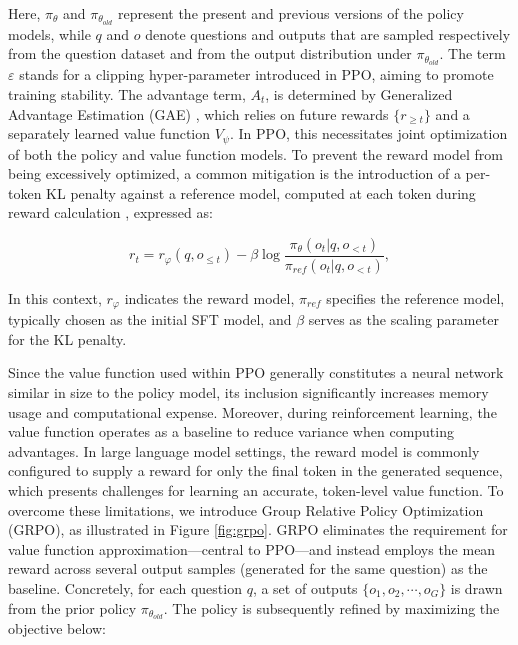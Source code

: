 \begin{itemize}[topsep=0pt]
Here, $\pi_{\theta}$ and $\pi_{\theta_{old}}$ represent the present and previous versions of the policy models, while $q$ and $o$ denote questions and outputs that are sampled respectively from the question dataset and from the output distribution under $\pi_{\theta_{old}}$. The term $\varepsilon$ stands for a clipping hyper-parameter introduced in PPO, aiming to promote training stability. The advantage term, $A_t$, is determined by Generalized Advantage Estimation (GAE) \citep{gae}, which relies on future rewards $\{r_{\ge t}\}$ and a separately learned value function $V_{\psi}$. In PPO, this necessitates joint optimization of both the policy and value function models. To prevent the reward model from being excessively optimized, a common mitigation is the introduction of a per-token KL penalty against a reference model, computed at each token during reward calculation \citep{ouyang2022training}, expressed as:

\begin{equation}
    r_{t} = r_\varphi(q, o_{\le t}) - \beta \log\frac{\pi_{\theta}(o_{t}|q, o_{<t})}{\pi_{ref}(o_{t}|q, o_{<t})},
\label{eq:PPO-reward}
\end{equation}

In this context, $r_\varphi$ indicates the reward model, $\pi_{ref}$ specifies the reference model, typically chosen as the initial SFT model, and $\beta$ serves as the scaling parameter for the KL penalty.

Since the value function used within PPO generally constitutes a neural network similar in size to the policy model, its inclusion significantly increases memory usage and computational expense. Moreover, during reinforcement learning, the value function operates as a baseline to reduce variance when computing advantages. In large language model settings, the reward model is commonly configured to supply a reward for only the final token in the generated sequence, which presents challenges for learning an accurate, token-level value function. To overcome these limitations, we introduce Group Relative Policy Optimization (GRPO), as illustrated in Figure \ref{fig:grpo}. GRPO eliminates the requirement for value function approximation—central to PPO—and instead employs the mean reward across several output samples (generated for the same question) as the baseline. Concretely, for each question $q$, a set of outputs $\{o_1, o_2, \cdots, o_G\}$ is drawn from the prior policy $\pi_{\theta_{old}}$. The policy is subsequently refined by maximizing the objective below:


\end{itemize}
